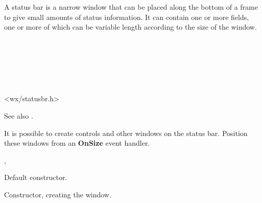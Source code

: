 \section{}\label{wxstatusbar}

A status bar is a narrow window that can be placed along the bottom of a frame to give
small amounts of status information. It can contain one or more fields, one or more of which can
be variable length according to the size of the window.

\\
\\


\\
\\


<wx/statusbr.h>


\twocolwidtha{5cm}
\begin{twocollist}\itemsep=0pt
\end{twocollist}

See also .


It is possible to create controls and other windows on the status bar. Position these windows
from an {\bf OnSize} event handler.


, 


\label{wxstatusbarctor}


Default constructor.


Constructor, creating the window.

